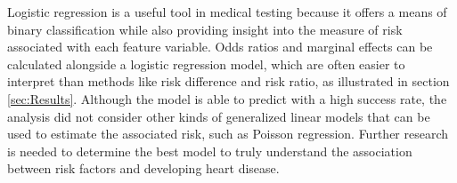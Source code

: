 Logistic regression is a useful tool in medical testing because it offers a means of binary classification while also providing insight into the measure of risk associated with each feature variable. 
Odds ratios and marginal effects can be calculated alongside a logistic regression model, which are often easier to interpret than methods like risk difference and risk ratio, as illustrated in section \ref{sec:Results}.
Although the model is able to predict with a high success rate, the analysis did not consider other kinds of generalized linear models that can be used to estimate the associated risk, such as Poisson regression.
Further research is needed to determine the best model to truly understand the association between risk factors and developing heart disease.